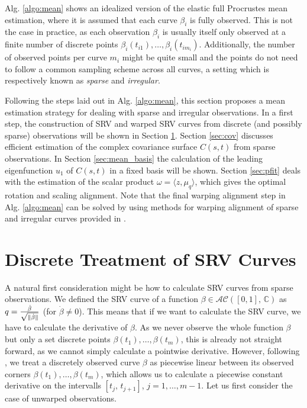 Alg. \ref{algo:mean} shows an idealized version of the elastic full Procrustes mean estimation, where it is assumed that each curve $\beta_i$ is fully observed.
This is not the case in practice, as each observation $\beta_i$ is usually itself only observed at a finite number of discrete points $\beta_i(t_{i1}), \dots, \beta_i(t_{im_i})$.
Additionally, the number of observed points per curve $m_i$ might be quite small and the points do not need to follow a common sampling scheme across all curves, a setting which is respectively known as \emph{sparse} and \emph{irregular}.

Following the steps laid out in Alg. \ref{algo:mean}, this section proposes a mean estimation strategy for dealing with sparse and irregular observations.
In a first step, the construction of SRV and warped SRV curves from discrete (and possibly sparse) observations will be shown in Section \ref{sec:discrete}.
Section \ref{sec:cov} discusses efficient estimation of the complex covariance surface $C(s,t)$ from sparse observations.
In Section \ref{sec:mean_basis} the calculation of the leading eigenfunction $u_1$ of $C(s,t)$ in a fixed basis will be shown.
Section \ref{sec:pfit} deals with the estimation of the scalar product $\omega = \langle z, \mu_q \rangle$, which gives the optimal rotation and scaling alignment.
Note that the final warping alignment step in Alg. \ref{algo:mean} can be solved by using methods for warping alignment of sparse and irregular curves provided in \cite{Steyer2021}.


\section{Discrete Treatment of SRV Curves}
\label{sec:discrete}
A natural first consideration might be how to calculate SRV curves from sparse observations.
We defined the SRV curve of a function $\beta \in \mathcal{AC}([0,1],\,\mathbb{C})$ as $q = \frac{\dot\beta}{\sqrt{\lVert\dot\beta\rVert}}$ (for $\dot\beta \neq 0$).
This means that if we want to calculate the SRV curve, we have to calculate the derivative of $\beta$.
As we never observe the whole function $\beta$ but only a set discrete points $\beta(t_1),\dots,\beta(t_m)$, this is already not straight forward, as we cannot simply calculate a pointwise derivative.
However, following \cite{Steyer2021}, we treat a discretely observed curve $\beta$ as piecewise linear between its observed corners $\beta(t_1),\dots,\beta(t_m)$, which allows us to calculate a piecewise constant derivative on the intervalls $[t_j,\,t_{j+1}]$, $j=1,\dots,m-1$.
Let us first consider the case of unwarped observations.

